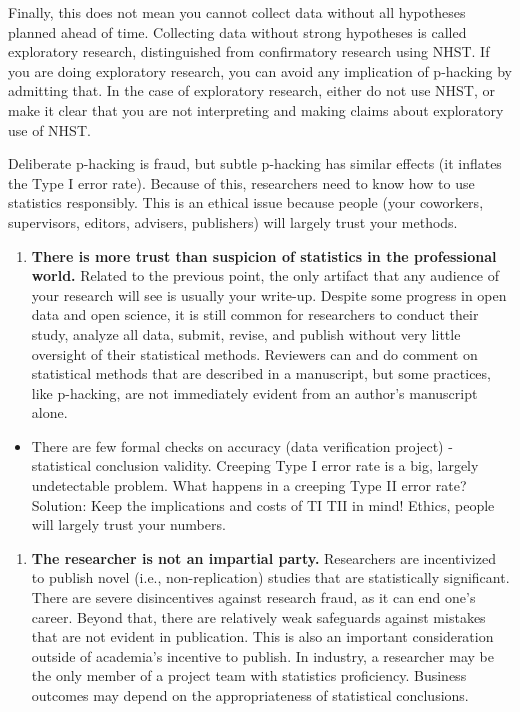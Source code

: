 \documentclass[
]{book}
\providecommand{\tightlist}{%
  \setlength{\itemsep}{0pt}\setlength{\parskip}{0pt}}
\begin{document}
Finally, this does not mean you cannot collect data without all hypotheses planned ahead of time. Collecting data without strong hypotheses is called exploratory research, distinguished from confirmatory research using NHST. If you are doing exploratory research, you can avoid any implication of p-hacking by admitting that. In the case of exploratory research, either do not use NHST, or make it clear that you are not interpreting and making claims about exploratory use of NHST.

Deliberate p-hacking is fraud, but subtle p-hacking has similar effects (it inflates the Type I error rate). Because of this, researchers need to know how to use statistics responsibly. This is an ethical issue because people (your coworkers, supervisors, editors, advisers, publishers) will largely trust your methods.

\begin{enumerate}
\def\labelenumi{\arabic{enumi}.}
\setcounter{enumi}{1}
\tightlist
\item
  \textbf{There is more trust than suspicion of statistics in the professional world.} Related to the previous point, the only artifact that any audience of your research will see is usually your write-up. Despite some progress in open data and open science, it is still common for researchers to conduct their study, analyze all data, submit, revise, and publish without very little oversight of their statistical methods. Reviewers can and do comment on statistical methods that are described in a manuscript, but some practices, like p-hacking, are not immediately evident from an author's manuscript alone.
\end{enumerate}

\begin{itemize}
\tightlist
\item
  There are few formal checks on accuracy (data verification project) - statistical conclusion validity. Creeping Type I error rate is a big, largely undetectable problem. What happens in a creeping Type II error rate? Solution: Keep the implications and costs of TI TII in mind! Ethics, people will largely trust your numbers.
\end{itemize}

\begin{enumerate}
\def\labelenumi{\arabic{enumi}.}
\setcounter{enumi}{2}
\tightlist
\item
  \textbf{The researcher is not an impartial party.} Researchers are incentivized to publish novel (i.e., non-replication) studies that are statistically significant. There are severe disincentives against research fraud, as it can end one's career. Beyond that, there are relatively weak safeguards against mistakes that are not evident in publication. This is also an important consideration outside of academia's incentive to publish. In industry, a researcher may be the only member of a project team with statistics proficiency. Business outcomes may depend on the appropriateness of statistical conclusions.
\end{enumerate}
\end{document}
